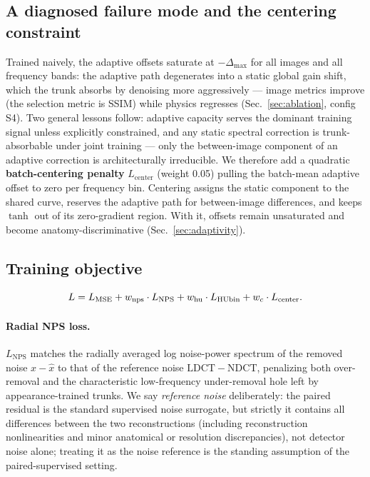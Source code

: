 \subsection{A diagnosed failure mode and the centering constraint}
\label{sec:centering}

Trained naively, the adaptive offsets saturate at $-\Delta_{\max}$ for all images and all frequency bands: the adaptive path degenerates into a static global gain shift, which the trunk absorbs by denoising more aggressively --- image metrics improve (the selection metric is SSIM) while physics regresses (Sec.~\ref{sec:ablation}, config S4). Two general lessons follow: adaptive capacity serves the dominant training signal unless explicitly constrained, and any static spectral correction is trunk-absorbable under joint training --- only the between-image component of an adaptive correction is architecturally irreducible. We therefore add a quadratic \textbf{batch-centering penalty} $L_{\mathrm{center}}$ (weight 0.05) pulling the batch-mean adaptive offset to zero per frequency bin. Centering assigns the static component to the shared curve, reserves the adaptive path for between-image differences, and keeps $\tanh$ out of its zero-gradient region. With it, offsets remain unsaturated and become anatomy-discriminative (Sec.~\ref{sec:adaptivity}).

\subsection{Training objective}
\label{sec:objective}

\begin{equation}
L = L_{\mathrm{MSE}} + w_{\mathrm{nps}} \cdot L_{\mathrm{NPS}} + w_{\mathrm{hu}} \cdot L_{\mathrm{HUbin}} + w_c \cdot L_{\mathrm{center}}.
\end{equation}

\paragraph{Radial NPS loss.}
$L_{\mathrm{NPS}}$ matches the radially averaged log noise-power spectrum of the removed noise $x - \hat{x}$ to that of the reference noise $\mathrm{LDCT} - \mathrm{NDCT}$, penalizing both over-removal and the characteristic low-frequency under-removal hole left by appearance-trained trunks. We say \emph{reference noise} deliberately: the paired residual is the standard supervised noise surrogate, but strictly it contains all differences between the two reconstructions (including reconstruction nonlinearities and minor anatomical or resolution discrepancies), not detector noise alone; treating it as the noise reference is the standing assumption of the paired-supervised setting.

